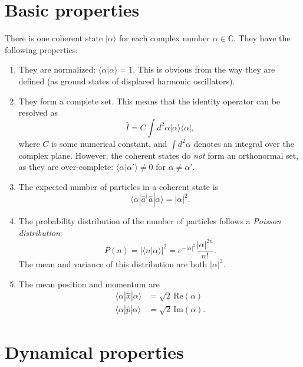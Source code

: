 \documentclass[pra,12pt]{revtex4}
\begin{document}
\section{Basic properties}

There is one coherent state $|\alpha\rangle$ for each complex number
$\alpha \in \mathbb{C}$.  They have the following properties:
\begin{enumerate}
\item They are normalized: $\langle\alpha|\alpha\rangle = 1$.  This is
  obvious from the way they are defined (as ground states of displaced
  harmonic oscillators).

\item They form a complete set.  This means that the identity operator
  can be resolved as
  \begin{equation}
    \hat{I} = C \int d^2\alpha |\alpha\rangle\langle\alpha|,
  \end{equation}
  where $C$ is some numerical constant, and $\int d^2\alpha$ denotes
  an integral over the complex plane.  However, the coherent states do
  \textit{not} form an orthonormal set, as they are over-complete:
  $\langle\alpha|\alpha'\rangle \ne 0$ for $\alpha \ne \alpha'$.

\item The expected number of particles in a coherent state is
  \begin{equation}
    \langle\alpha| \hat{a}^\dagger\hat{a} | \alpha\rangle
    = |\alpha|^2.
  \end{equation}

\item The probability distribution of the number of particles follows
  a \textit{Poisson distribution}:
  \begin{equation}
    P(n) = |\langle n | \alpha\rangle|^2 = e^{-|\alpha|^2} \frac{|\alpha|^{2n}}{n!}.
  \end{equation}
  The mean and variance of this distribution are both $|\alpha|^2$.

\item The mean position and momentum are
  \begin{align}
    \langle \alpha | \hat{x}|\alpha\rangle &= \sqrt{2} \, \mathrm{Re}(\alpha) 
    \label{x} \\
    \langle \alpha | \hat{p}|\alpha\rangle &= \sqrt{2} \, \mathrm{Im}(\alpha).
    \label{p}
  \end{align}
\end{enumerate}

\section{Dynamical properties}
\end{document}
